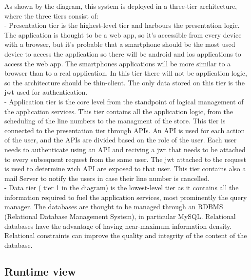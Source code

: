 As shown by the diagram, this system is deployed in a three-tier
architecture, where the three tiers consist of: \\
- Presentation tier is the highest-level tier and harbours the presentation logic.
The application is thought to be a web app, so it's accessible from every device with a browser, but it's probable that
a smartphone should be the most used device to access the application so there will be android and ios applications to access
the web app.
The smartphones applications will be more similar to a browser than to a real application.
In this tier there will not be application logic, so the architecture should be thin-client.
The only data stored on this tier is the jwt used for authentication. \\
- Application tier is the core level from the standpoint of logical management of the application services.
This tier contains all the application logic, from the scheduling of the line numbers to the managment of the store.
This tier is connected to the presentation tier through APIs.
An API is used for each action of the user, and the APIs are divided based on the role of the user.
Each user needs to authenticate using an API and reciving a jwt that needs to be attached to every subsequent request from the same user.
The jwt attached to the request is used to determine wich API are exposed to that user.
This tier contains also a mail Server to notify the users in case their line number is cancelled. \\

- Data tier ( tier 1 in the diagram) is the lowest-level tier as it contains all the information required to fuel the
application services, most prominently the query manager. The
databases are thought to be managed through an RDBMS
(Relational Database Management System), in particular MySQL. Relational databases
have the advantage of having near-maximum information density.
Relational constraints can improve the quality and
integrity of the content of the database.

\subsection{Runtime view}



